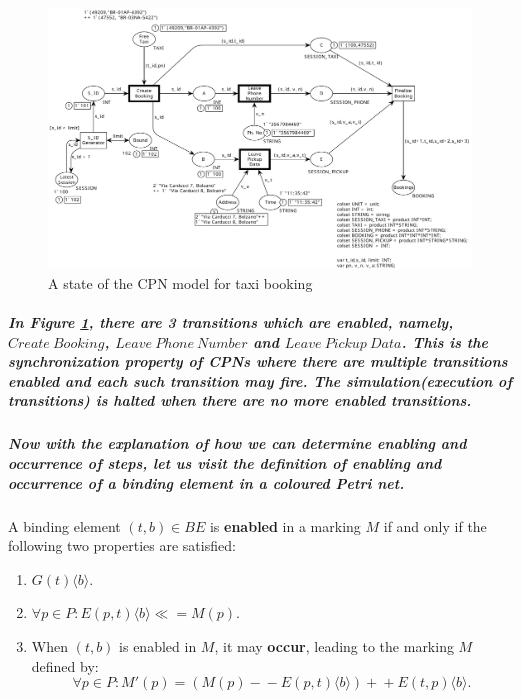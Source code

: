 \begin{figure}[!htbp]
	\centering
	\includegraphics[scale = 0.35]{CPN_Taxi_Booking_one_step.pdf}
	\caption{A state of the CPN model for taxi booking}
	\label{fig:CPN_Taxi_Booking_one_step}
\end{figure}

\subparagraph*{\textnormal{In Figure \ref{fig:CPN_Taxi_Booking_one_step}, there are 3 transitions which are enabled, namely, $\mathit{Create\ Booking}$, $\mathit{Leave\ Phone\ Number}$ and $\mathit{Leave\ Pickup\ Data}$. This is the synchronization property of CPNs where there are multiple transitions enabled and each such transition may fire. The simulation(execution of transitions) is halted when there are no more enabled transitions.}}

\subparagraph*{\textnormal{Now with the explanation of how we can determine enabling and occurrence of steps, let us visit the definition of enabling and occurrence of a binding element in a coloured Petri net.}}
\begin{defs}
	\label{defs:enabling_binding_cpn}
	A binding element $\mathit{(t,b) \in BE}$ is \textbf{enabled} in a marking $\mathit{M}$ if and only
	if the following two properties are satisfied:
	\begin{enumerate}
		\item $\mathit{G(t)\langle b \rangle}$.
		\item $\mathit{\forall p \in P : E(p,t)\langle b \rangle \ll= M(p)}$.
		\item When $\mathit{(t,b)}$ is enabled in $\mathit{M}$, it may \textbf{occur}, leading to the marking $\mathit{M}$ defined by:
		\begin{equation*}
			\forall p \in P : M'(p) = \left(M(p) -\!- E(p,t)\langle b \rangle \right) +\!\!+ E(t, p)\langle b \rangle.
		\end{equation*}
	\end{enumerate}
\end{defs}


